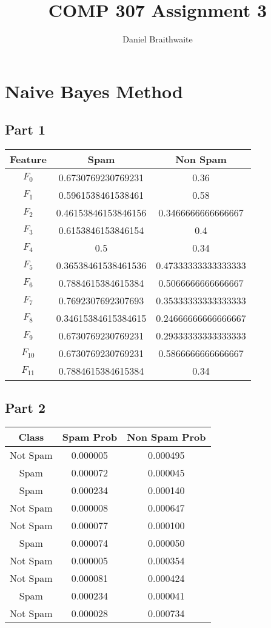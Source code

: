 \documentclass[a4paper, 12pt]{article}
\title{COMP 307 Assignment 3}
\author{Daniel Braithwaite}
\begin{document}
	\maketitle
	\newpage
  	
	\section{Naive Bayes Method}
		\subsection{Part 1}
			\begin{center}
\begin{tabular}{|c|c|c|}
\hline
Feature & Spam & Non Spam\\\hline$F_0$ & 0.6730769230769231 & 0.36\\
$F_1$ & 0.5961538461538461 & 0.58\\
$F_2$ & 0.46153846153846156 & 0.3466666666666667\\
$F_3$ & 0.6153846153846154 & 0.4\\
$F_4$ & 0.5 & 0.34\\
$F_5$ & 0.36538461538461536 & 0.47333333333333333\\
$F_6$ & 0.7884615384615384 & 0.5066666666666667\\
$F_7$ & 0.7692307692307693 & 0.35333333333333333\\
$F_8$ & 0.34615384615384615 & 0.24666666666666667\\
$F_9$ & 0.6730769230769231 & 0.29333333333333333\\
$F_{10}$ & 0.6730769230769231 & 0.5866666666666667\\
$F_{11}$ & 0.7884615384615384 & 0.34\\
\hline
\end{tabular}
			\end{center}
			
		\subsection{Part 2}
			\begin{center}
				\begin{tabular}{|c|c|c|}
				\hline
Class & Spam Prob & Non Spam Prob\\
\hline
Not Spam & 0.000005 & 0.000495\\
Spam & 0.000072 & 0.000045\\
Spam & 0.000234 & 0.000140\\
Not Spam & 0.000008 & 0.000647\\
Not Spam & 0.000077 & 0.000100\\
Spam & 0.000074 & 0.000050\\
Not Spam & 0.000005 & 0.000354\\
Not Spam & 0.000081 & 0.000424\\
Spam & 0.000234 & 0.000041\\
Not Spam & 0.000028 & 0.000734\\
\hline
\end{tabular}
			\end{center}
			
\end{document}
